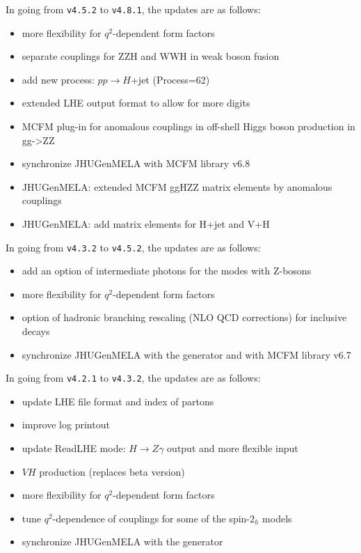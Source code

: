 \documentclass[aps,superscriptaddress,nofootinbib]{revtex4}
\begin{document}
\noindent
In going from \verb|v4.5.2| to \verb|v4.8.1|, the updates are as follows:

\begin{itemize}
\item more flexibility for $q^2$-dependent form factors
\item separate couplings for ZZH and WWH in weak boson fusion
\item add new process: $pp\to H$+jet (Process=62)
\item extended LHE output format to allow for more digits
\item MCFM plug-in for anomalous couplings in off-shell Higgs boson production in gg->ZZ
\item synchronize JHUGenMELA with MCFM library v6.8
\item JHUGenMELA: extended MCFM ggHZZ matrix elements by anomalous couplings
\item JHUGenMELA: add matrix elements for H+jet and V+H
\end{itemize}


\noindent
In going from \verb|v4.3.2| to \verb|v4.5.2|, the updates are as follows:

\begin{itemize}
\item add an option of intermediate photons for the modes with Z-bosons
\item more flexibility for $q^2$-dependent form factors
\item option of hadronic branching rescaling (NLO QCD corrections) for inclusive decays
\item synchronize JHUGenMELA with the generator and with MCFM library v6.7
\end{itemize}

\noindent
In going from \verb|v4.2.1| to \verb|v4.3.2|, the updates are as follows:

\begin{itemize}
\item update LHE file format and index of partons
\item improve log printout
\item update ReadLHE mode: $H\to Z\gamma$ output and more flexible input
\item $VH$ production (replaces beta version)
\item more flexibility for $q^2$-dependent form factors
\item tune $q^2$-dependence of couplings for some of the spin-$2_h$ models
\item synchronize JHUGenMELA with the generator
\end{itemize}
\end{document}
